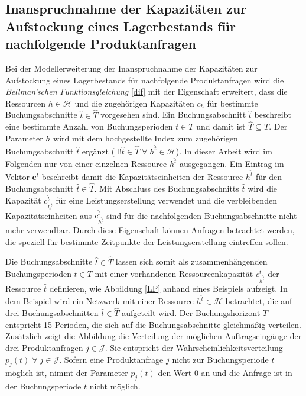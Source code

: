 \subsection{Inanspruchnahme der Kapazitäten zur Aufstockung eines Lagerbestands für nachfolgende Produktanfragen}

Bei der Modellerweiterung der Inanspruchnahme der Kapazitäten zur Aufstockung eines Lagerbestands für nachfolgende Produktanfragen wird die \textit{Bellman'schen Funktionsgleichung} \ref{dif} mit der Eigenschaft erweitert, dass die Ressourcen $h\in\mathcal{H}$ und die zugehörigen Kapazitäten $c_{h}$ für bestimmte Buchungsabschnitte $\hat{t}\in \hat{T}$ vorgesehen sind. Ein Buchungsabschnitt $\hat{t}$ beschreibt eine bestimmte Anzahl von Buchungsperioden $t\in T$ und damit ist $\hat{T}\subseteq T$. Der Parameter $h$ wird mit dem hochgestellte Index zum zugehörigen Buchungsabschnitt $\hat{t}$ ergänzt ($\exists{!\hat{t}}\in\hat{T}\; \forall\; h^{\hat{t}}\in\mathcal{H}$). In dieser Arbeit wird im Folgenden nur von einer einzelnen Ressource $h^{\hat{t}}$ ausgegangen. Ein Eintrag im Vektor $\textbf{c}^{\hat{t}}$ beschreibt damit die Kapazitätseinheiten der Ressource $h^{\hat{t}}$ für den Buchungsabschnitt $\hat{t}\in\hat{T}$. Mit Abschluss des Buchungsabschnitts $\hat{t}$ wird die Kapazität $c^{\hat{t}}_{h^{\hat{t}}}$ für eine Leistungserstellung verwendet und die verbleibenden Kapazitätseinheiten aus $c^{\hat{t}}_{h^{\hat{t}}}$ sind für die nachfolgenden Buchungsabschnitte nicht mehr verwendbar. Durch diese Eigenschaft können Anfragen betrachtet werden, die speziell für bestimmte Zeitpunkte der Leistungserstellung eintreffen sollen. 

Die Buchungsabschnitte $\hat{t}\in \hat{T}$ lassen sich somit als zusammenhängenden Buchungsperioden $t\in T$ mit einer vorhandenen Ressourcenkapazität $c^{\hat{t}}_{h^{\hat{t}}}$ der Ressource $\hat{t}$ definieren, wie Abbildung \ref{LP} anhand eines Beispiels aufzeigt. In dem Beispiel wird ein Netzwerk mit einer Ressource $h^{\hat{t}}\in\mathcal{H}$ betrachtet, die auf drei Buchungsabschnitten $\hat{t}\in\hat{T}$ aufgeteilt wird. Der Buchungshorizont $T$ entspricht 15 Perioden, die sich auf die Buchungsabschnitte gleichmäßig verteilen. Zusätzlich zeigt die Abbildung die Verteilung der möglichen Auftragseingänge der drei Produktanfragen $j\in\mathcal{J}$. Sie entspricht der Wahrscheinlichkeitsverteilung $p_j(t)\; \forall\; j\in\mathcal{J}$. Sofern eine Produktanfrage $j$ nicht zur Buchungsperiode $t$ möglich ist, nimmt der Parameter $p_j(t)$ den Wert $0$ an und die Anfrage ist in der Buchungsperiode $t$ nicht möglich. 

